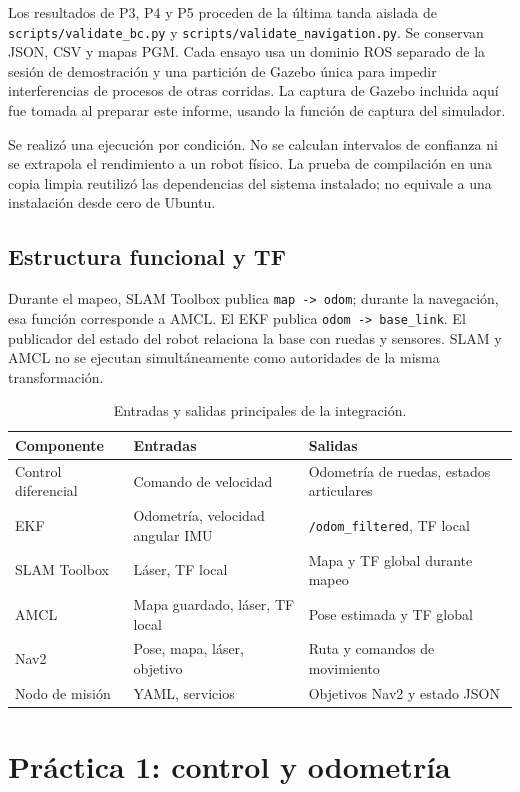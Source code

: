 \documentclass[11pt,a4paper]{article}
\newcommand{\archivo}[1]{\nolinkurl{#1}}
\begin{document}
Los resultados de P3, P4 y P5 proceden de la última tanda aislada de \archivo{scripts/validate_bc.py} y \archivo{scripts/validate_navigation.py}. Se conservan JSON, CSV y mapas PGM. Cada ensayo usa un dominio ROS separado de la sesión de demostración y una partición de Gazebo única para impedir interferencias de procesos de otras corridas. La captura de Gazebo incluida aquí fue tomada al preparar este informe, usando la función de captura del simulador.

Se realizó una ejecución por condición. No se calculan intervalos de confianza ni se extrapola el rendimiento a un robot físico. La prueba de compilación en una copia limpia reutilizó las dependencias del sistema instalado; no equivale a una instalación desde cero de Ubuntu.

\subsection{Estructura funcional y TF}
Durante el mapeo, SLAM Toolbox publica \archivo{map -> odom}; durante la navegación, esa función corresponde a AMCL. El EKF publica \archivo{odom -> base_link}. El publicador del estado del robot relaciona la base con ruedas y sensores. SLAM y AMCL no se ejecutan simultáneamente como autoridades de la misma transformación.

\begin{table}[H]\centering\caption{Entradas y salidas principales de la integración.}
\begin{tabularx}{\linewidth}{lXX}\toprule
Componente & Entradas & Salidas\\\midrule
Control diferencial & Comando de velocidad & Odometría de ruedas, estados articulares\\
EKF & Odometría, velocidad angular IMU & \archivo{/odom_filtered}, TF local\\
SLAM Toolbox & Láser, TF local & Mapa y TF global durante mapeo\\
AMCL & Mapa guardado, láser, TF local & Pose estimada y TF global\\
Nav2 & Pose, mapa, láser, objetivo & Ruta y comandos de movimiento\\
Nodo de misión & YAML, servicios & Objetivos Nav2 y estado JSON\\\bottomrule
\end{tabularx}\end{table}

\section{Práctica 1: control y odometría}
\end{document}

